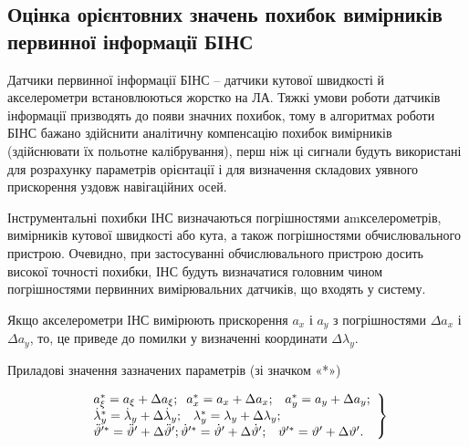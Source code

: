 % 
% 
\subsection{Оцінка орієнтовних значень похибок вимірників первинної інформації БІНС}

Датчики первинної інформації БІНС -- датчики кутової швидкості й акселерометри встановлюються жорстко на ЛА. 
Тяжкі умови роботи датчиків інформації призводять до появи значних похибок, тому в алгоритмах роботи БІНС бажано 
здійснити аналітичну компенсацію похибок вимірників (здійснювати їх польотне калібрування), перш ніж ці сигнали 
будуть використані для розрахунку параметрів орієнтації і для визначення складових уявного прискорення уздовж навігаційних осей.

Інструментальні похибки ІНС визначаються погрішностями аmкселерометрів, вимірників кутової швидкості або кута, 
а також погрішностями обчислювального пристрою. Очевидно, при застосуванні обчислювального пристрою досить високої 
точності похибки, ІНС будуть визначатися головним чином погрішностями первинних вимірювальних датчиків, що входять у систему.

Якщо акселерометри ІНС вимірюють прискорення $a_{x} $ і $a_{y} $ з погрішностями $\Delta a_{x} $ і $\Delta a_{y} $, то,  
це приведе до помилки у визначенні координати $\Delta \lambda _{y} $.

Приладові значення зазначених параметрів (зі значком «*»)

\begin{equation} 
\label{eq:err} 
\left. 
\begin{array}{l} 
{a_{\xi }^{*} =a_{\xi } +\Delta a_{\xi } ;{\rm \; \; }a_{x}^{*} =a_{x} +\Delta a_{x} ;{\rm \; \; \; }a_{y}^{*} =a_{y} +\Delta a_{y} ;} 
\\ {\dot{\lambda }_{y}^{*} =\dot{\lambda }_{y} +\Delta \dot{\lambda }_{y} ;{\rm \; \; \; }\lambda _{y}^{*} =\lambda _{y} 
+\Delta \lambda _{y} ;}
\\ {\ddot{\vartheta }'^{*} =\ddot{\vartheta }'+\Delta \ddot{\vartheta }'; \dot{\vartheta }'^{*} =\dot{\vartheta }'+\Delta \dot{\vartheta }';
{\rm \; \; \; }\vartheta '^{*} =\vartheta '+\Delta \vartheta '.} \end{array}\right\} 
\end{equation} 

